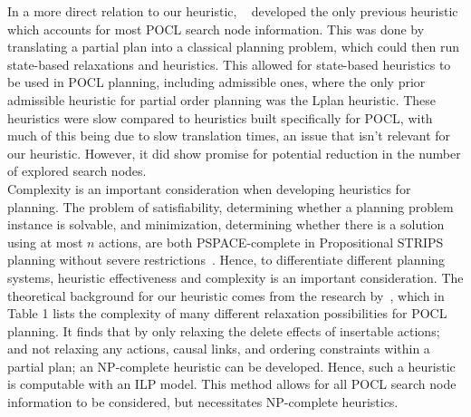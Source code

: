 In a more direct relation to our heuristic, ~\cite{Bercher2013POCLHeuristicsViaEncoding} developed the only previous heuristic which accounts for most POCL search node information. This was done by translating a partial plan into a classical planning problem, which could then run state-based relaxations and heuristics. This allowed for state-based heuristics to be used in POCL planning, including admissible ones, where the only prior admissible heuristic for partial order planning was the Lplan heuristic. These heuristics were slow compared to heuristics built specifically for POCL, with much of this being due to slow translation times, an issue that isn't relevant for our heuristic. However, it did show promise for potential reduction in the number of explored search nodes.\\


Complexity is an important consideration when developing heuristics for planning. The problem of satisfiability, determining whether a planning problem instance is solvable, and minimization, determining whether there is a solution using at most $n$ actions, are both PSPACE-complete in Propositional STRIPS planning without severe restrictions~\citep{Bylander1994ComplexityOfSTRIPS}. Hence, to differentiate different planning systems, heuristic effectiveness and complexity is an important consideration. The theoretical background for our heuristic comes from the research by~\cite{Bercher2021POCLComplexities}, which in Table 1 lists the complexity of many different relaxation possibilities for POCL planning. It finds that by only relaxing the delete effects of insertable actions; and not relaxing any actions, causal links, and ordering constraints within a partial plan; an NP-complete heuristic can be developed. Hence, such a heuristic is computable with an ILP model. This method allows for all POCL search node information to be considered, but necessitates NP-complete heuristics.